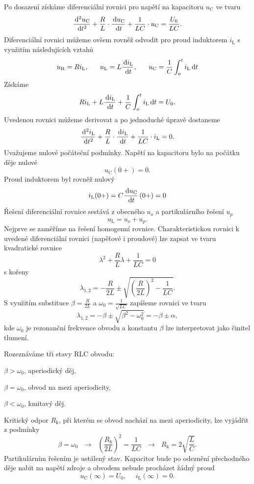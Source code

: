Po dosazení získáme diferenciální rovnici pro napětí na kapacitoru $u_\mathrm{C}$ ve tvaru
$$
\frac{\,\mathrm{d}^2 u_\mathrm{C}}{\,\mathrm{d} t^2} + \frac{R}{L} \cdot \frac{\,\mathrm{d} u_\mathrm{C}}{\,\mathrm{d} t} + \frac{1}{LC} \cdot u_\mathrm{C} = \frac{U_0}{LC}.
$$
Diferenciální rovnici můžeme ovšem rovněž odvodit pro proud induktorem $i_\mathrm{L}$ s využitím následujících vztahů
$$
u_\mathrm{R} = Ri_\mathrm{L},~~~~~
u_\mathrm{L} = L \frac{\,\mathrm{d} i_\mathrm{L}}{\,\mathrm{d} t} ,~~~~~u_\mathrm{C} = \frac{1}{C} \int_o^t i_\mathrm{L} \,\mathrm{d} t
$$
Získáme
$$
Ri_\mathrm{L} + L \frac{\,\mathrm{d} i_\mathrm{L}}{\,\mathrm{d} t} + \frac{1}{C} \int_o^t i_\mathrm{L} \,\mathrm{d} t = U_0.
$$
Uvedenou rovnici můžeme derivovat a po jednoduché úpravě dostaneme
$$
\frac{\,\mathrm{d}^2 i_\mathrm{L}}{\,\mathrm{d} t^2} + \frac{R}{L} \cdot \frac{\,\mathrm{d} i_\mathrm{L}}{\,\mathrm{d} t} + \frac{1}{LC} \cdot i_\mathrm{L} = 0.
$$
Uvažujeme nulové počáteční podmínky. Napětí na kapacitoru bylo na počátku děje nulové
$$
u_\mathrm{C}(0+) = 0.
$$
Proud induktorem byl rovněž nulový
$$
i_\mathrm{L}(0+) = C \frac{\,\mathrm{d} u_\mathrm{C}}{\,\mathrm{d} t} \left( 0+ \right) = 0
$$
Řešení diferenciální rovnice sestává z obecného $u_o$ a partikulárního řešení $u_p$
$$
u_\mathrm{L} = u_o + u_p.
$$
Nejprve se zaměříme na řešení homogenní rovnice. Charakteristickou rovnici k uvedené diferenciální rovnici (napěťové i proudové) lze zapsat ve tvaru kvadratické rovnice
$$
\lambda^2 + \frac{R}{L} \lambda + \frac{1}{LC} = 0
$$
s kořeny
$$
\lambda_{1,2} = -\frac{R}{2L} \pm \sqrt{\left( \frac{R}{2L} \right)^2 - \frac{1}{LC}}.
$$
S využitím substituce $\beta = \frac{R}{2L}$ a $\omega_0 = \frac{1}{\sqrt{LC}}$ zapíšeme rovnici ve tvaru
$$
\lambda_{1,2} = -\beta \pm \sqrt{\beta^2 - \omega_0^2} = -\beta \pm \alpha,
$$
kde $\omega_0$ je rezonanční frekvence obvodu a konstantu $\beta$ lze interpretovat jako činitel tlumení. 

Rozeznáváme tři stavy RLC obvodu:
\begin{enumerate*}
\item $\beta > \omega_0$, aperiodický děj,
\item $\beta = \omega_0$, obvod na mezi aperiodicity,
\item $\beta < \omega_0$, kmitavý děj.
\end{enumerate*}
Kritický odpor $R_\mathrm{k}$, při kterém se obvod nachází na mezi aperiodicity, lze vyjádřit z podmínky
$$
\beta = \omega_0~~~ \rightarrow ~~~\left( \frac{R_\mathrm{k}}{2L} \right)^2 = \frac{1}{LC}~~~ \rightarrow ~~~R_\mathrm{k} = 2 \sqrt{\frac{L}{C}}.
$$
Partikulárním řešením je ustálený stav. Kapacitor bude po odeznění přechodného děje nabit na napětí zdroje a obvodem nebude procházet žádný proud 
$$
u_\mathrm{C}(\infty) = U_0,~~~~~~
i_\mathrm{L}(\infty) = 0.
$$

